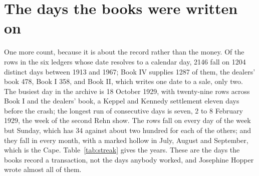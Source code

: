 



\section{The days the books were written on}

One more count, because it is about the record rather than the money. Of the rows in the six ledgers whose date resolves to a calendar day, 2146 fall on 1204 distinct days between 1913 and 1967; Book IV supplies 1287 of them, the dealers' book 478, Book I 358, and Book II, which writes one date to a sale, only two. The busiest day in the archive is 18 October 1929, with twenty-nine rows across Book I and the dealers' book, a Keppel and Kennedy settlement eleven days before the crash; the longest run of consecutive days is seven, 2 to 8 February 1929, the week of the second Rehn show. The rows fall on every day of the week but Sunday, which has 34 against about two hundred for each of the others; and they fall in every month, with a marked hollow in July, August and September, which is the Cape. Table~\ref{tab:streak} gives the years. These are the days the books record a transaction, not the days anybody worked, and Josephine Hopper wrote almost all of them.
